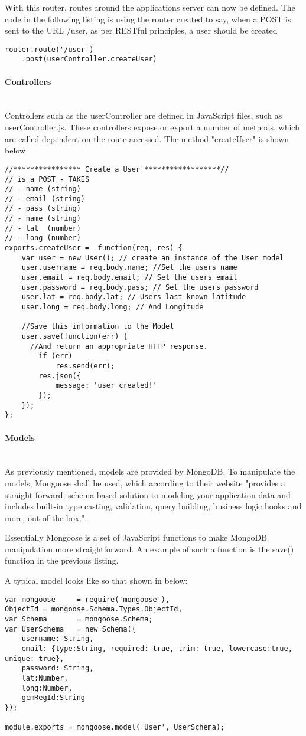 \documentclass[a4paper]{article}
\newcommand{\subsubsubsection}[1]{\paragraph{#1}\mbox{}\\}
\begin{document}
With this router, routes around the applications server can now be defined. The code in the following listing is using the router  created to say, when a POST is sent to the URL /user, as per RESTful principles, a user should be created
\begin{lstlisting}[label=Defining a route,caption=Defining a route]
router.route('/user')
    .post(userController.createUser)
\end{lstlisting}

\subsubsubsection{Controllers}
Controllers such as the userController are defined in JavaScript files, such as userController.js.
These controllers expose or export a number of methods, which are called dependent on the route accessed. The method "createUser" is shown below

\begin{lstlisting}[label=Creating a user,caption=Creating a user]
//**************** Create a User ******************//
// is a POST - TAKES
// - name (string)
// - email (string)
// - pass (string)
// - name (string)
// - lat  (number)
// - long (number)
exports.createUser =  function(req, res) {
    var user = new User(); // create an instance of the User model
    user.username = req.body.name; //Set the users name
    user.email = req.body.email; // Set the users email
    user.password = req.body.pass; // Set the users password
    user.lat = req.body.lat; // Users last known latitude
    user.long = req.body.long; // And Longitude
    
    //Save this information to the Model
    user.save(function(err) {
      //And return an appropriate HTTP response.
        if (err)
            res.send(err);
        res.json({
            message: 'user created!'
        });
    });
};
\end{lstlisting}

\subsubsubsection{Models}
As previously mentioned, models are provided by MongoDB. To manipulate the models, Mongoose shall be used, which according to their website "provides a straight-forward, schema-based solution to modeling your application data and includes built-in type casting, validation, query building, business logic hooks and more, out of the box.". 

Essentially Mongoose is a set of JavaScript functions to make MongoDB manipulation more straightforward. An example of such a function is the save() function in the previous listing.

A typical model looks like so that shown in below:
\begin{lstlisting}[label=A typical model,caption=A typical model]
var mongoose     = require('mongoose'),
ObjectId = mongoose.Schema.Types.ObjectId,
var Schema       = mongoose.Schema;
var UserSchema   = new Schema({
    username: String,
    email: {type:String, required: true, trim: true, lowercase:true, unique: true},
    password: String,
    lat:Number,
    long:Number,
    gcmRegId:String
});

module.exports = mongoose.model('User', UserSchema);
\end{lstlisting}
\end{document}

